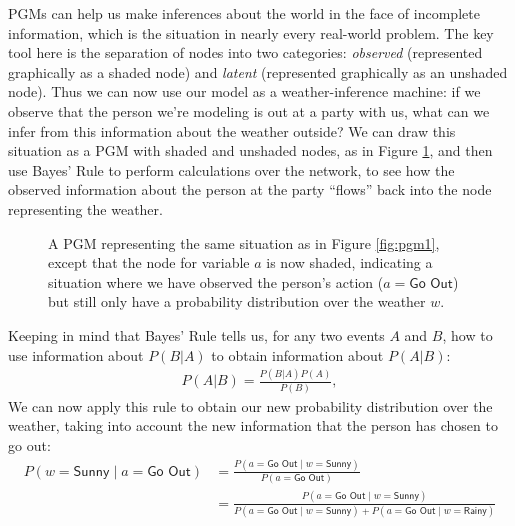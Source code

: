 \documentclass[11pt]{article}
\begin{document}
PGMs can help us make inferences about the world in the face of incomplete information, which is the situation in nearly every real-world problem. The key tool here is the separation of nodes into two categories: \textit{observed} (represented graphically as a shaded node) and \textit{latent} (represented graphically as an unshaded node). Thus we can now use our model as a weather-inference machine: if we observe that the person we're modeling is out at a party with us, what can we infer from this information about the weather outside? We can draw this situation as a PGM with shaded and unshaded nodes, as in Figure \ref{fig:pgm2}, and then use Bayes' Rule to perform calculations over the network, to see how the observed information about the person at the party ``flows'' back into the node representing the weather.

\begin{figure}[ht!]
	\centering
	\caption{A PGM representing the same situation as in Figure \ref{fig:pgm1}, except that the node for variable $a$ is now shaded, indicating a situation where we have observed the person's action ($a = \textsf{Go Out}$) but still only have a probability distribution over the weather $w$.}
	\label{fig:pgm2}
\end{figure}


Keeping in mind that Bayes' Rule tells us, for any two events $A$ and $B$, how to use information about $P(B|A)$ to obtain information about $P(A|B)$:
\begin{align*}
	P(A | B) = \frac{P(B | A)P(A)}{P(B)},
\end{align*}
We can now apply this rule to obtain our new probability distribution over the weather, taking into account the new information that the person has chosen to go out:
\begin{align*}
	P(w = \textsf{Sunny} \; | \; a = \textsf{Go Out}) &= \frac{P(a = \textsf{Go Out} \; | \; w = \textsf{Sunny})}{P(a = \textsf{Go Out})} \\
	&= \frac{P(a = \textsf{Go Out} \; | \; w = \textsf{Sunny})}{P(a = \textsf{Go Out} \; | \; w = \textsf{Sunny}) + P(a = \textsf{Go Out} \; | \; w = \textsf{Rainy})}
\end{align*}
\end{document}
